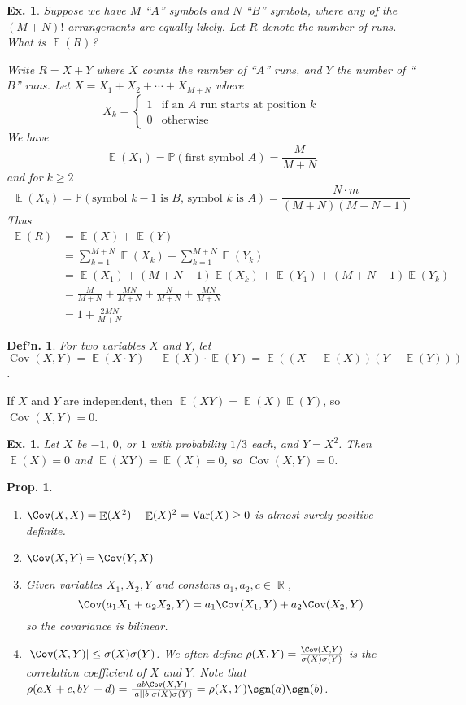 \documentclass[12pt, a4paper]{book}
\DeclareMathOperator{\R}{\mathbb{R}}
\DeclareMathOperator{\E}{\mathbb{E}}
\DeclareMathOperator{\Var}{Var}
\renewcommand{\Pr}{\mathbb{P}}
\newtheorem{definition}[theorem]{Def'n.}
\newtheorem{proposition}[theorem]{Prop.}
\newtheorem{example}[theorem]{Ex.}
\theoremstyle{nonumberplain}
\begin{document}
\begin{example}
    Suppose we have $M$ ``$A$'' symbols and $N$ ``$B$'' symbols, where any of the $(M+N)!$ arrangements are equally likely.
    Let $R$ denote the number of runs.
    What is $\E(R)$?

    Write $R=X+Y$ where $X$ counts the number of ``$A$'' runs, and $Y$ the number of ``$B$'' runs.
    Let $X=X_1+X_2+\cdots+X_{M+N}$ where
    \[X_k=
        \begin{cases}
            1 &\text{if an $A$ run starts at position $k$}\\
            0 &\text{otherwise}
        \end{cases}
    \]
    We have
    \[\E(X_1)=\Pr(\text{first symbol $A$})=\frac{M}{M+N}\]
    and for $k\geq 2$
    \[\E(X_k)=\Pr(\text{symbol $k-1$ is $B$, symbol $k$ is $A$})=\frac{N\cdot m}{(M+N)(M+N-1)}\]
    Thus
    \begin{align*}
        \E(R) &= \E(X)+\E(Y)\\
              &= \sum\limits_{k=1}^{M+N}\E(X_k)+ \sum\limits_{k=1}^{M+N}\E(Y_k)\\
              &= \E(X_1)+(M+N-1)\E(X_k) + \E(Y_1)+(M+N-1)\E(Y_k)\\
              &= \frac{M}{M+N}+\frac{MN}{M+N}+\frac{N}{M+N}+\frac{MN}{M+N}\\
              &= 1+\frac{2MN}{M+N}
    \end{align*}
\end{example}
\begin{definition}
    For two variables $X$ and $Y$, let $\operatorname{Cov}(X,Y)=\E(X\cdot Y)-\E(X)\cdot\E(Y)=\E((X-\E(X))(Y-\E(Y)))$.
\end{definition}
If $X$ and $Y$ are independent, then $\E(XY)=\E(X)\E(Y)$, so $\operatorname{Cov}(X,Y)=0$.
\begin{example}
    Let $X$ be $-1$, $0$, or $1$ with probability $1/3$ each, and $Y=X^2$.
    Then $\E(X)=0$ and $\E(XY)=\E(X)=0$, so $\operatorname{Cov}(X,Y)=0$.
\end{example}
\begin{proposition}
    \begin{enumerate}
        \item $\Cov(X,X)=\E(X^2)-\E(X)^2=\Var(X)\geq 0$ is almost surely positive definite.
        \item $\Cov(X,Y)=\Cov(Y,X)$
        \item Given variables $X_1,X_2,Y$ and constans $a_1,a_2,c\in\R$,
            \[\Cov(a_1X_1+a_2X_2,Y)=a_1\Cov(X_1,Y)+a_2\Cov(X_2,Y)\]
            so the covariance is bilinear.
        \item $|\Cov(X,Y)|\leq\sigma(X)\sigma(Y)$.
            We often define $\rho(X,Y)=\frac{\Cov(X,Y)}{\sigma(X)\sigma(Y)}$ is the correlation coefficient of $X$ and $Y$.
            Note that $\rho(aX+c,bY+d)=\frac{ab\Cov(X,Y)}{|a||b|\sigma(X)\sigma(Y)}=\rho(X,Y)\sgn(a)\sgn(b)$.
    \end{enumerate}
\end{proposition}
\end{document}
